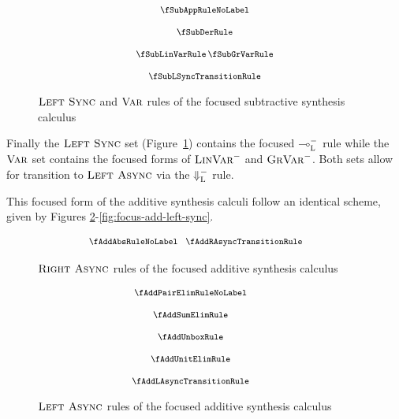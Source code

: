 \begin{figure}[H]
  \begin{align*}
    {\footnotesize{
\begin{array}{c}
  \fSubAppRuleNoLabel
  \\[1.25em]
  \fSubDerRule
  \\[1.25em]
  \fSubLinVarRule
  \,
  \fSubGrVarRule
  \\[1.25em]
  \fSubLSyncTransitionRule
  \end{array}
    }}
  \end{align*}
  \caption{$\textsc{Left Sync}$ and $\textsc{Var}$ rules of the focused subtractive synthesis calculus}
  \label{fig:focus-sub-left-sync}
\end{figure}

Finally the $\textsc{Left Sync}$ set (Figure~\ref{fig:focus-sub-left-sync})
contains the focused $\multimap_\textsc{L}^-$ rule while the $\textsc{Var}$ set
contains the focused forms of $\textsc{LinVar}^-$ and $\textsc{GrVar}^-$. Both
sets allow for transition to $\textsc{Left Async}$ via the
$\Downarrow_\textsc{L}^-$ rule.

This focused form of the additive synthesis calculi follow an identical scheme,
given by Figures \ref{fig:focus-add-right-async}-\ref{fig:focus-add-left-sync}. 


\begin{figure}[H]
  \begin{align*}
    {\footnotesize{
\hspace{-2em}\begin{array}{c}
  \fAddAbsRuleNoLabel
  \;\;\;
  \fAddRAsyncTransitionRule
  \end{array}
    }}
  \end{align*}
  \caption{$\textsc{Right Async}$ rules of the focused additive synthesis calculus}
  \label{fig:focus-add-right-async}
\end{figure}

\begin{figure}[H]
  \begin{align*}
    {\footnotesize{
\hspace{-3em}\begin{array}{c}
  \fAddPairElimRuleNoLabel
  \\[1.25em]
  \fAddSumElimRule
  \\[1.25em]
  \fAddUnboxRule
  \\[1.25em]
  \fAddUnitElimRule
  \\[1.25em]
  \fAddLAsyncTransitionRule
  \end{array}
    }}
  \end{align*}
  \caption{$\textsc{Left Async}$ rules of the focused additive synthesis calculus}
  \label{fig:focus-add-left-async}
\end{figure}

